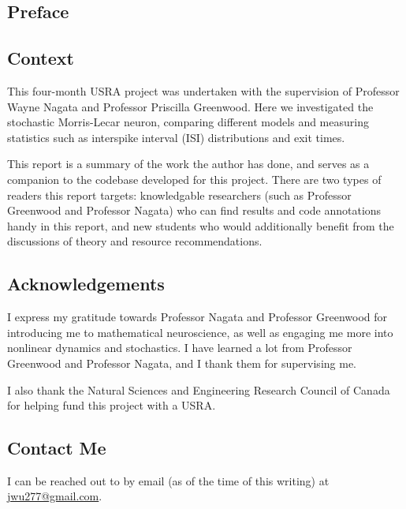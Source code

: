 \documentclass[letterpaper,12pt]{article}
\numberwithin{table}{section}
\numberwithin{figure}{section}
\numberwithin{equation}{section}
\begin{document}
\begin{flushleft}

    \section{Preface}

    \subsection{Context}

    This four-month USRA project was undertaken with the supervision of Professor Wayne Nagata and Professor Priscilla Greenwood. Here we investigated the stochastic Morris-Lecar neuron, comparing different models and measuring statistics such as interspike interval (ISI) distributions and exit times.

    This report is a summary of the work the author has done, and serves as a companion to the codebase developed for this project. There are two types of readers this report targets: knowledgable researchers (such as Professor Greenwood and Professor Nagata) who can find results and code annotations handy in this report, and new students who would additionally benefit from the discussions of theory and resource recommendations.

    \subsection{Acknowledgements}

    I express my gratitude towards Professor Nagata and Professor Greenwood for introducing me to mathematical neuroscience, as well as engaging me more into nonlinear dynamics and stochastics. I have learned a lot from Professor Greenwood and Professor Nagata, and I thank them for supervising me.

    I also thank the Natural Sciences and Engineering Research Council of Canada for helping fund this project with a USRA.

    \subsection{Contact Me}
    I can be reached out to by email (as of the time of this writing) at \href{mailto:jwu277@gmail.com}{jwu277@gmail.com}.

    \pagebreak


\end{flushleft}
\end{document}
